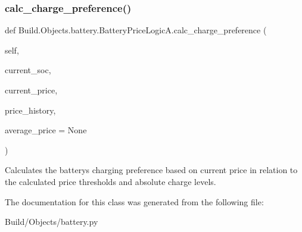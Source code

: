 \subsubsection{\texorpdfstring{calc\+\_\+charge\+\_\+preference()}{calc\_charge\_preference()}}
{\footnotesize\ttfamily def Build.\+Objects.\+battery.\+Battery\+Price\+Logic\+A.\+calc\+\_\+charge\+\_\+preference (\begin{DoxyParamCaption}\item[{}]{self,  }\item[{}]{current\+\_\+soc,  }\item[{}]{current\+\_\+price,  }\item[{}]{price\+\_\+history,  }\item[{}]{average\+\_\+price = {\ttfamily None} }\end{DoxyParamCaption})}



Calculates the battery\textquotesingle{}s charging preference based on current price in relation to the calculated price thresholds and absolute charge levels. 



The documentation for this class was generated from the following file\+:\begin{DoxyCompactItemize}
\item 
Build/\+Objects/battery.\+py\end{DoxyCompactItemize}
